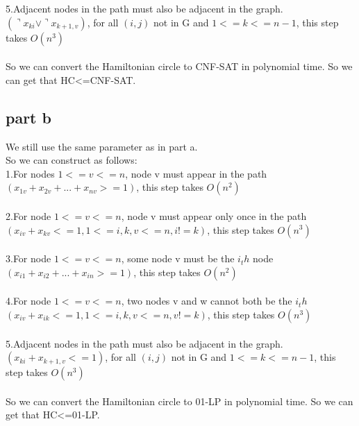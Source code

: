 \documentclass[paper=a4, fontsize=11pt]{scrartcl} %
\numberwithin{equation}{section} %
\numberwithin{figure}{section} %
\numberwithin{table}{section} %
\begin{document}
5.Adjacent nodes in the path must also be adjacent in the graph.\\
$(\urcorner x_{ki} \vee \urcorner x_{k+1,v})$, for all $(i,j)$ not in G and $1<=k<=n-1$, this step takes $O(n^3)$ \\ \\

So we can convert the Hamiltonian circle to CNF-SAT in polynomial time. So we can get that HC<=CNF-SAT.

\subsection{\textbf{part b}}
We still use the same parameter as in part a.\\

So we can construct as follows:\\
1.For nodes $1<=v<=n$, node v must appear in the path\\
$(x_{1v} + x_{2v} + ... + x_{nv} >=1)$, this step takes $O(n^2)$\\ \\

2.For node $1<=v<=n$, node v must appear only once in the path\\
$( x_{iv} + x_{kv} <= 1, 1<=i,k,v<=n, i !=k)$, this step takes $O(n^3)$ \\ \\

3.For node $1<=v<=n$, some node v must be the $i_th$ node\\
$(x_{i1} + x_{i2} + ... + x_{in}>=1)$, this step takes $O(n^2)$\\ \\

4.For node $1<=v<=n$, two nodes v and w cannot both be the $i_th$\\
$( x_{iv} + x_{ik} <= 1 , 1<=i,k,v<=n, v!=k)$, this step takes $O(n^3)$ \\ \\

5.Adjacent nodes in the path must also be adjacent in the graph.\\
$( x_{ki} + x_{k+1,v} <= 1)$, for all $(i,j)$ not in G and $1<=k<=n-1$, this step takes $O(n^3)$ \\ \\

So we can convert the Hamiltonian circle to 01-LP in polynomial time. So we can get that HC<=01-LP.
\end{document}
